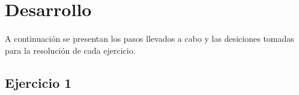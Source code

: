 \section{Desarrollo}
\paragraph{}
A continuaci\'on se presentan los pasos llevados a cabo y las desiciones tomadas para la resoluci\'on de cada ejercicio.

\subsection{Ejercicio 1}

